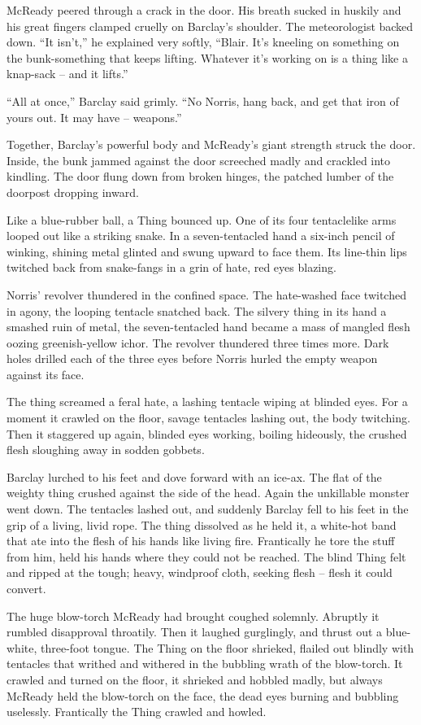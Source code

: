 \documentclass[letterpaper,openany,12pt]{memoir}		%
\begin{document}
McReady peered through a crack in the door. His breath sucked in huskily and his
great fingers clamped cruelly on Barclay's shoulder. The meteorologist backed
down. ``It isn't,'' he explained very softly, ``Blair. It's kneeling on
something on the bunk-something that keeps lifting. Whatever it's working on is
a thing like a knap-sack -- and it lifts.''

``All at once,'' Barclay said grimly. ``No Norris, hang back, and get that iron
of yours out. It may have -- weapons.''

Together, Barclay's powerful body and McReady's giant strength struck the door.
Inside, the bunk jammed against the door screeched madly and crackled into
kindling. The door flung down from broken hinges, the patched lumber of the
doorpost dropping inward.

Like a blue-rubber ball, a Thing bounced up. One of its four tentaclelike arms
looped out like a striking snake. In a seven-tentacled hand a six-inch pencil of
winking, shining metal glinted and swung upward to face them. Its line-thin lips
twitched back from snake-fangs in a grin of hate, red eyes blazing.

Norris' revolver thundered in the confined space. The hate-washed face twitched
in agony, the looping tentacle snatched back. The silvery thing in its hand a
smashed ruin of metal, the seven-tentacled hand became a mass of mangled flesh
oozing greenish-yellow ichor. The revolver thundered three times more. Dark
holes drilled each of the three eyes before Norris hurled the empty weapon
against its face.

The thing screamed a feral hate, a lashing tentacle wiping at blinded eyes. For
a moment it crawled on the floor, savage tentacles lashing out, the body
twitching. Then it staggered up again, blinded eyes working, boiling hideously,
the crushed flesh sloughing away in sodden gobbets.

Barclay lurched to his feet and dove forward with an ice-ax. The flat of the
weighty thing crushed against the side of the head. Again the unkillable monster
went down. The tentacles lashed out, and suddenly Barclay fell to his feet in
the grip of a living, livid rope. The thing dissolved as he held it, a white-hot
band that ate into the flesh of his hands like living fire. Frantically he tore
the stuff from him, held his hands where they could not be reached. The blind
Thing felt and ripped at the tough; heavy, windproof cloth, seeking flesh --
flesh it could convert.

The huge blow-torch McReady had brought coughed solemnly. Abruptly it rumbled
disapproval throatily. Then it laughed gurglingly, and thrust out a blue-white,
three-foot tongue. The Thing on the floor shrieked, flailed out blindly with
tentacles that writhed and withered in the bubbling wrath of the blow-torch. It
crawled and turned on the floor, it shrieked and hobbled madly, but always
McReady held the blow-torch on the face, the dead eyes burning and bubbling
uselessly. Frantically the Thing crawled and howled.
\end{document}
